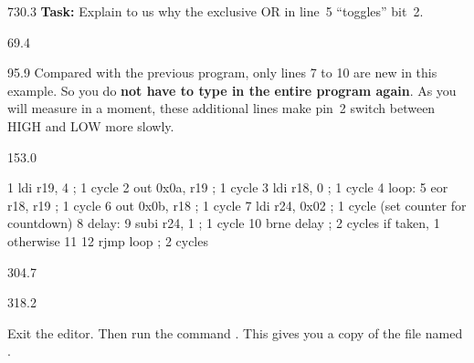 \documentclass{aslab}
\makeatletter
\newcommand*\aN[1]{\textcolor{codeorange}{#1}}%
\newcommand*\aI[1]{\textcolor{codegreen}{#1}}%
\newcommand*\aK[1]{\textcolor{codered}{#1}}%
\newcommand*\aR[1]{\textcolor{codecyan}{#1}}%
\newcommand*\aC[1]{\textcolor{codepurple}{#1}}%
\newenvironment{asmlisting}{\par\ttfamily\asm@setup}{\par}
\makeatother
\begin{document}
\begin{region}{730.3}
\textbf{Task:} Explain to us why the exclusive OR in line~5 ``toggles''
bit~2.
\end{region}

\nextpage
\begin{region}{69.4}
\end{region}

\begin{region}[pitch=13.53]{95.9}
Compared with the previous program, only lines 7 to 10 are new in this
example. So you do \textbf{not have to type in the entire program again}.
As you will measure in a moment, these additional lines make pin~2 switch
between HIGH and LOW more slowly.
\end{region}

\begin{region}{153.0}
\begin{asmlisting}
  \aN{1}         \aI{ldi}     \aR{r19},    \aK{4}      \aC{; 1 cycle}
  \aN{2}         \aI{out}     \aK{0x0a},   \aR{r19}    \aC{; 1 cycle}
  \aN{3}         \aI{ldi}     \aR{r18},    \aK{0}      \aC{; 1 cycle}
  \aN{4 loop}:
  \aN{5}         \aI{eor}     \aR{r18},    \aR{r19}    \aC{; 1 cycle}
  \aN{6}         \aI{out}     \aK{0x0b},   \aR{r18}    \aC{; 1 cycle}
  \aN{7}         \aI{ldi}     \aR{r24},    \aK{0x02}   \aC{; 1 cycle (set counter for countdown)}
  \aN{8 delay}:
  \aN{9}         \aI{subi}    \aR{r24},    \aK{1}      \aC{; 1 cycle}
 \aN{10}         \aI{brne}    \aR{delay}          \aC{; 2 cycles if taken, 1 otherwise}
 \aN{11}
 \aN{12}         \aI{rjmp}    \aR{loop}           \aC{; 2 cycles}
\end{asmlisting}
\end{region}

\begin{region}{304.7}
\end{region}

\begin{region}[pitch=13.5]{318.2}
\begin{numlist}
\item Exit the editor. Then run the command
  . This gives you a copy of the
  file  named .
\end{numlist}
\end{region}
\end{document}
